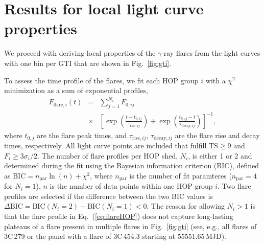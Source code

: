 \documentclass[twocolumn,linenumbers]{aastex62}
\newcommand{\gray}{$\gamma$-ray\xspace}
\begin{document}
\section{Results for local light curve properties}
\label{sec:results-local}

We proceed with deriving local properties of the \gray flares from the light curves with one bin per GTI that are shown in Fig.~\ref{fig:gti}.

To assess the time profile of the flares,
we fit each HOP group $i$ with a $\chi^2$ minimization as a sum of exponential profiles, 
\begin{eqnarray}
    F_{\mathrm{flare},i}(t) &=& 
    \sum\limits_{j = 1}^{N_i} F_{0,ij}\nonumber\\
    &\times&\left[\exp\left(\frac{t - t_{0,ij}}{\tau_{\mathrm{rise},ij}}\right) + \exp
    \left(\frac{t_{0,ij} - t}{\tau_{\mathrm{decay},ij}}\right)\right]^{-1}\!\!\!,
    \label{eq:flareHOP}
\end{eqnarray}
where $t_{0,j}$ are the flare peak times, and $\tau_{\mathrm{rise},ij}$, $\tau_{\mathrm{decay},ij}$ are the flare rise and decay times, respectively.
All light curve points are included that fulfill $\mathrm{TS}\geqslant9$ and $F_i \geqslant 3\sigma_i/2 $.
The number of flare profiles per HOP shed, $N_i$, is either 1 or 2 and determined during the fit using the Bayesian information criterion (BIC), defined as $\mathrm{BIC} = n_\mathrm{par}\ln(n) + \chi^2$, where $n_\mathrm{par}$ is the number of fit paramteres ($n_\mathrm{par} = 4$ for $N_i = 1$), $n$ is the number of data points within one HOP group $i$. Two flare profiles are selected if the difference between the two BIC values is $\Delta\mathrm{BIC} = \mathrm{BIC}(N_i = 2) - \mathrm{BIC}(N_i = 1) < 0$.
The reason for allowing $N_i > 1$ is that the flare profile in Eq.~(\ref{eq:flareHOP}) does not capture long-lasting plateaus of a flare present in multiple flares in Fig.~\ref{fig:gti} (see, e.g., all flares of 3C\,279 or the panel with a flare of 3C\,454.3 starting at 55551.65\,MJD).
\end{document}
